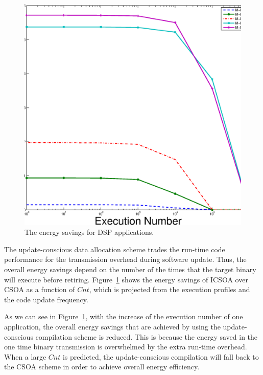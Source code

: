 \begin{figure}[htbp]
\begin{center}
\includegraphics[scale=0.4]{./figures/da-energy.eps}
\caption{The energy savings for DSP applications.}
\label{energy-dsp}
\end{center}
\end{figure}

The update-conscious data allocation scheme trades the run-time code performance for the transmission overhead during software update. Thus, the overall energy savings depend on the number of the times that the target binary will execute before retiring. Figure~\ref{energy-dsp} shows the energy savings of ICSOA over CSOA as a function of 
$Cnt$, which is projected from the execution profiles and the code update frequency.



As we can see in Figure~\ref{energy-dsp}, with the increase of the execution number of one application, the overall energy savings that are achieved by using the update-conscious compilation scheme is reduced. This is because the energy saved in the one time binary transmission is overwhelmed by the extra run-time overhead. When a large $Cnt$ is predicted, the update-conscious compilation will fall back to the CSOA scheme in order to achieve overall energy efficiency. 

